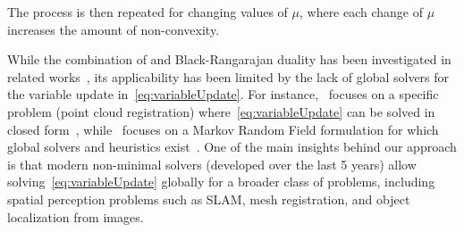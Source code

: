 The process is then repeated for changing values of $\mu$, where each change of $\mu$ increases the amount of non-convexity. 
\setcounter{theorem}{1}
\begin{remark}
While the combination of \GNC and Black-Rangarajan duality has been investigated in related works~\cite{Black96ijcv-unification,Zhou16eccv-fastGlobalRegistration}, its applicability has been limited by the lack of global solvers for the variable update in~\eqref{eq:variableUpdate}. 
For instance,~\cite{Zhou16eccv-fastGlobalRegistration} focuses on a specific problem (point cloud registration) where~\eqref{eq:variableUpdate} can be solved in closed form~\cite{Arun87pami,Horn87josa},  
while~\cite{Black96ijcv-unification} focuses on a Markov Random Field formulation for which global solvers and heuristics exist~\cite{Hu19ral-fuses}.
 One of the main insights behind our approach is that modern non-minimal solvers (developed over the last 5 years) 
 allow solving~\eqref{eq:variableUpdate} globally for a broader class of problems,  
 including spatial perception problems such as SLAM, mesh registration, and object localization from images.
\end{remark}


